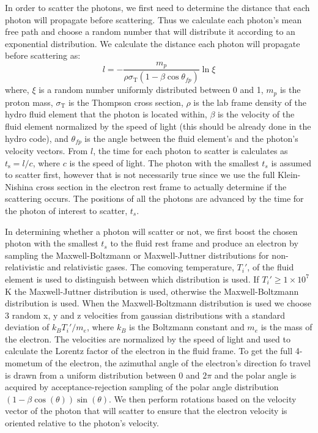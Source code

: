 \documentclass[12pt,a4paper]{article}
\begin{document}
In order to scatter the photons, we first need to determine the distance that each photon will propagate before scattering. Thus we calculate each photon's mean free path and choose a random number that will distribute it according to an exponential distribution. We calculate the distance each photon will propagate before scattering as:
\[
l=-\frac{m_p}{\rho\sigma_\mathrm{T}(1-\beta\cos\theta_{fp})}\ln\xi
\]
where, $\xi$ is a random number uniformly distributed between 0 and 1, $m_p$ is the proton mass, $\sigma_\mathrm{T}$ is the Thompson cross section, $\rho$ is the lab frame density of the hydro fluid element that the photon is located within, $\beta$ is the velocity of the fluid element normalized by the speed of light (this should be already done in the hydro code), and $\theta_{fp}$ is the angle between the fluid element's and the photon's velocity vectors. From $l$, the time for each photon to scatter is calculates as $t_\mathrm{s}=l/c$, where $c$ is the speed of light. The photon with the smallest $t_s$ is assumed to scatter first, however that is not necessarily true since we use the full Klein-Nishina cross section in the electron rest frame to actually determine if the scattering occurs. The positions of all the photons are advanced by the time for the photon of interest to scatter, $t_s$.

In determining whether a photon will scatter or not, we first boost the chosen photon with the smallest $t_s$ to the fluid rest frame and produce an electron by sampling the Maxwell-Boltzmann or Maxwell-Juttner distributions for non-relativistic and relativistic gases. The comoving temperature, $T_i'$, of the fluid element is used to distinguish between which distribution is used. If $T_i' \ge 1 \times 10^7$ K the Maxwell-Juttner distribution is used, otherwise the Maxwell-Boltzmann distribution is used. When the Maxwell-Boltzmann distribution is used we choose 3 random x, y and z velocities from gaussian distributions with a standard deviation of $k_BT_i'/m_e$, where $k_B$ is the Boltzmann constant and $m_e$ is the mass of the electron. The velocities are normalized by the speed of light and used to calculate the Lorentz factor of the electron in the fluid frame. To get the full 4-mometum of the electron, the azimuthal angle of the electron's direction fo travel is drawn from a uniform distribution between 0 and $2\pi$ and the polar angle is acquired by acceptance-rejection sampling of the polar angle distribution $(1-\beta\cos(\theta))\sin(\theta) $. We then perform rotations based on the velocity vector of the photon that will scatter to ensure that the electron velocity is oriented relative to the photon's velocity.
\end{document}
